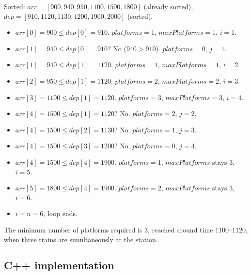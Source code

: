 Sorted: $\textit{arr} = [900, 940, 950, 1100, 1500, 1800]$ (already sorted),
$\textit{dep} = [910, 1120, 1130, 1200, 1900, 2000]$ (sorted).

\begin{itemize}
  \item $\textit{arr}[0]=900 \le \textit{dep}[0]=910$. $\textit{platforms}=1$,
        $\textit{maxPlatforms}=1$, $i=1$.
  \item $\textit{arr}[1]=940 \le \textit{dep}[0]=910$? No ($940 > 910$).
        $\textit{platforms}=0$, $j=1$.
  \item $\textit{arr}[1]=940 \le \textit{dep}[1]=1120$. $\textit{platforms}=1$,
        $\textit{maxPlatforms}=1$, $i=2$.
  \item $\textit{arr}[2]=950 \le \textit{dep}[1]=1120$. $\textit{platforms}=2$,
        $\textit{maxPlatforms}=2$, $i=3$.
  \item $\textit{arr}[3]=1100 \le \textit{dep}[1]=1120$. $\textit{platforms}=3$,
        $\textit{maxPlatforms}=3$, $i=4$.
  \item $\textit{arr}[4]=1500 \le \textit{dep}[1]=1120$? No.
        $\textit{platforms}=2$, $j=2$.
  \item $\textit{arr}[4]=1500 \le \textit{dep}[2]=1130$? No.
        $\textit{platforms}=1$, $j=3$.
  \item $\textit{arr}[4]=1500 \le \textit{dep}[3]=1200$? No.
        $\textit{platforms}=0$, $j=4$.
  \item $\textit{arr}[4]=1500 \le \textit{dep}[4]=1900$. $\textit{platforms}=1$,
        $\textit{maxPlatforms}$ stays $3$, $i=5$.
  \item $\textit{arr}[5]=1800 \le \textit{dep}[4]=1900$. $\textit{platforms}=2$,
        $\textit{maxPlatforms}$ stays $3$, $i=6$.
  \item $i = n = 6$, loop ends.
\end{itemize}

The minimum number of platforms required is $\boxed{3}$, reached around
time $1100$--$1120$, when three trains are simultaneously at the station.

\subsection*{C++ implementation}

